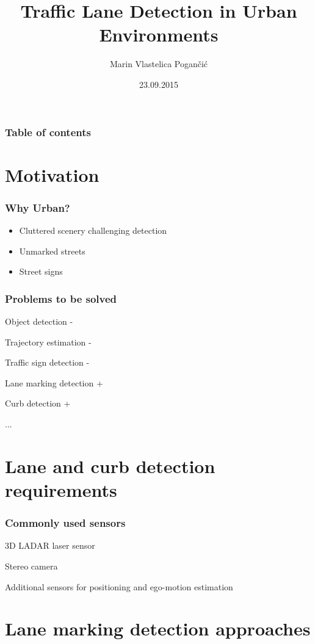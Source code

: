 \documentclass[t]{beamer}
\date{23.09.2015}
\title{Traffic Lane Detection in Urban Environments}
\author{Marin Vlastelica Pogančić}
\institute[]{Forschüngszentrum Informatik (FZI)}
\newcommand{\spank}{\setlength{\itemsep}{14pt}}
\begin{document}
\frame
{
  \maketitle
}

\frame
{
	\frametitle{Table of contents}
	\tableofcontents
}

\section{Motivation}

\frame
{
	\frametitle{Why Urban?}
	\begin{itemize}
		\spank
		\item Cluttered scenery challenging detection
		\item Unmarked streets
		\item Street signs
	\end{itemize}

}

\frame
{
	\frametitle{Problems to be solved}
	\itemize
	{
		\spank
		\item Object detection -
		\item Trajectory estimation -
		\item Traffic sign detection -
		\item Lane marking detection +
		\item Curb detection +
		\item ...
	}
}

\section{Lane and curb detection requirements}

\frame
{
	\tableofcontents[ 
    currentsubsection, 
    sectionstyle=show/hide, 
    subsectionstyle=show/shaded,
    sectionstyle=show/shaded 
    ] 
}

\frame
{
	\frametitle{Commonly used sensors}
	\itemize
	{
		\spank
		\item 3D LADAR laser sensor
		\item Stereo camera
		\item Additional sensors for positioning and ego-motion estimation
		\
	}	
}


\section{Lane marking detection approaches}
\end{document}
